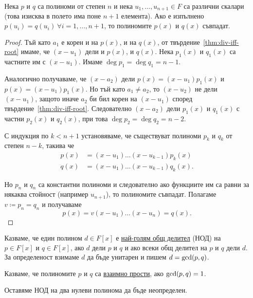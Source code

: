 \documentclass[numbers=endperiod, DIV=15]{scrartcl}
\begin{document}
\begin{theorem}\label{thm:coeff-principle}
  Нека $p$ и $q$ са полиноми от степен $n$ и нека $u_1, \ldots, u_{n+1} \in F$ са различни скалари (това изисква в полето има поне $n+1$ елемента). Ако е изпълнено $p(u_i) = q(u_i)~\forall i = 1, \ldots, n + 1$, то полиномите $p(x)$ и $q(x)$ съвпадат.
\end{theorem}
\begin{proof}
  Тъй като $a_1$ е корен и на $p(x)$, и на $q(x)$, от твърдение~\ref{thm:div-iff-root} имаме, че $(x - u_1)$ дели и $p(x)$, и $q(x)$. Нека $p_1(x)$ и $q_1(x)$ са частните им с $(x - u_1)$. Имаме $\deg p_1 = \deg q_1 = n - 1$.

  Аналогично получаваме, че $(x - a_2)$ дели $p(x) = (x - u_1) p_1(x)$ и $p(x) = (x - u_1) p_1(x)$. Но тъй като $a_1 \neq a_2$, то $(x - u_2)$ не дели $(x - u_1)$, защото иначе $a_2$ би бил корен на $(x - u_1)$ според твърдение~\ref{thm:div-iff-root}. Следователно $(x - a_2)$ дели $p_1(x)$ и $q_1(x)$ с частни $p_2(x)$ и $q_2(x)$, при това $\deg p_2 = \deg q_2 = n - 2$.

  С индукция по $k < n + 1$ установяваме, че съществуват полиноми $p_k$ и $q_k$ от степен $n - k$, такива че
  \begin{align*}
    p(x) &= (x - u_1) \ldots (x - u_{k-1}) p_k(x) \\
    q(x) &= (x - u_1) \ldots (x - u_{k-1}) q_k(x).
  \end{align*}

  Но $p_n$ и $q_n$ са константни полиноми и следователно ако функциите им са равни за някаква стойност (например $u_{n+1}$), то полиномите съвпадат. Полагаме $v \coloneqq p_n = q_n$ и получаваме
  \begin{displaymath}
    p(x) = v (x - u_1) \ldots (x - u_n) = q(x).
  \end{displaymath}
\end{proof}

\begin{definition}
  Казваме, че един полином $d \in F[x]$ е \underline{най-голям общ делител} (НОД) на $p \in F[x]$ и $q \in F[x]$, ако $d$ дели $p$ и $q$ и ако всеки общ делител на $p$ и $q$ дели $d$. За определеност взимаме $d$ да бъде унитарен и пишем $d = \operatorname{gcd}(p, q)$.

  Казваме, че полиномите $p$ и $q$ са \underline{взаимно прости}, ако $\operatorname{gcd}(p, q) = 1$.

  Оставяме НОД на два нулеви полинома да бъде неопределен.
\end{definition}
\end{document}
